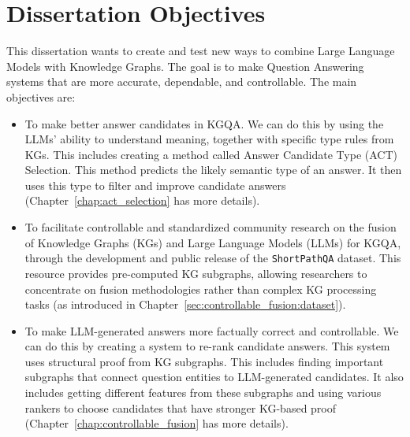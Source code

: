 \section{Dissertation Objectives}
\label{sec:intro:objectives}
This dissertation wants to create and test new ways to combine Large Language Models with Knowledge Graphs. The goal is to make Question Answering systems that are more accurate, dependable, and controllable. The main objectives are:
\begin{itemize}
    \item To make better answer candidates in KGQA. We can do this by using the LLMs' ability to understand meaning, together with specific type rules from KGs. This includes creating a method called Answer Candidate Type (ACT) Selection. This method predicts the likely semantic type of an answer. It then uses this type to filter and improve candidate answers (Chapter~\ref{chap:act_selection} has more details).
    \item To facilitate controllable and standardized community research on the fusion of Knowledge Graphs (KGs) and Large Language Models (LLMs) for KGQA, through the development and public release of the \texttt{ShortPathQA} dataset. This resource provides pre-computed KG subgraphs, allowing researchers to concentrate on fusion methodologies rather than complex KG processing tasks (as introduced in Chapter~\ref{sec:controllable_fusion:dataset}).
    \item To make LLM-generated answers more factually correct and controllable. We can do this by creating a system to re-rank candidate answers. This system uses structural proof from KG subgraphs. This includes finding important subgraphs that connect question entities to LLM-generated candidates. It also includes getting different features from these subgraphs and using various rankers to choose candidates that have stronger KG-based proof (Chapter~\ref{chap:controllable_fusion} has more details).
\end{itemize}

